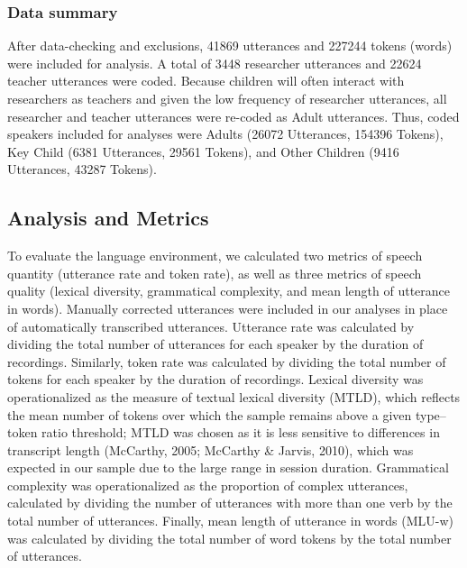 \documentclass[10pt, letterpaper]{article}
\begin{document}
\hypertarget{data-summary}{%
\subsubsection{Data summary}\label{data-summary}}

After data-checking and exclusions, 41869 utterances and 227244 tokens
(words) were included for analysis. A total of 3448 researcher
utterances and 22624 teacher utterances were coded. Because children
will often interact with researchers as teachers and given the low
frequency of researcher utterances, all researcher and teacher
utterances were re-coded as Adult utterances. Thus, coded speakers
included for analyses were Adults (26072 Utterances, 154396 Tokens), Key
Child (6381 Utterances, 29561 Tokens), and Other Children (9416
Utterances, 43287 Tokens).

\hypertarget{analysis-and-metrics}{%
\subsection{Analysis and Metrics}\label{analysis-and-metrics}}

To evaluate the language environment, we calculated two metrics of
speech quantity (utterance rate and token rate), as well as three
metrics of speech quality (lexical diversity, grammatical complexity,
and mean length of utterance in words). Manually corrected utterances
were included in our analyses in place of automatically transcribed
utterances. Utterance rate was calculated by dividing the total number
of utterances for each speaker by the duration of recordings. Similarly,
token rate was calculated by dividing the total number of tokens for
each speaker by the duration of recordings. Lexical diversity was
operationalized as the measure of textual lexical diversity (MTLD),
which reflects the mean number of tokens over which the sample remains
above a given type--token ratio threshold; MTLD was chosen as it is less
sensitive to differences in transcript length (McCarthy, 2005; McCarthy
\& Jarvis, 2010), which was expected in our sample due to the large
range in session duration. Grammatical complexity was operationalized as
the proportion of complex utterances, calculated by dividing the number
of utterances with more than one verb by the total number of utterances.
Finally, mean length of utterance in words (MLU-w) was calculated by
dividing the total number of word tokens by the total number of
utterances.
\end{document}
